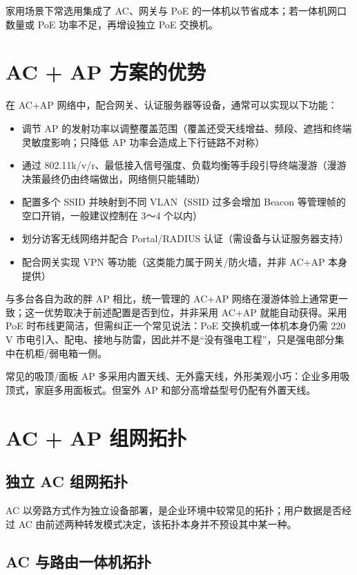 \documentclass[UTF8]{ctexbook}
\begin{document}
家用场景下常选用集成了 AC、网关与 PoE 的一体机以节省成本；若一体机网口数量或 PoE 功率不足，再增设独立 PoE 交换机。

\section{AC + AP 方案的优势}

在 AC+AP 网络中，配合网关、认证服务器等设备，通常可以实现以下功能：

\begin{itemize}
  \item 调节 AP 的发射功率以调整覆盖范围（覆盖还受天线增益、频段、遮挡和终端灵敏度影响；只降低 AP 功率会造成上下行链路不对称）
  \item 通过 802.11k/v/r、最低接入信号强度、负载均衡等手段引导终端漫游（漫游决策最终仍由终端做出，网络侧只能辅助）
  \item 配置多个 SSID 并映射到不同 VLAN（SSID 过多会增加 Beacon 等管理帧的空口开销，一般建议控制在 3～4 个以内）
  \item 划分访客无线网络并配合 Portal/RADIUS 认证（需设备与认证服务器支持）
  \item 配合网关实现 VPN 等功能（这类能力属于网关/防火墙，并非 AC+AP 本身提供）
\end{itemize}

与多台各自为政的胖 AP 相比，统一管理的 AC+AP 网络在漫游体验上通常更一致；这一优势取决于前述配置是否到位，并非采用 AC+AP 就能自动获得。采用 PoE 时布线更简洁，但需纠正一个常见说法：PoE 交换机或一体机本身仍需 220 V 市电引入、配电、接地与防雷，因此并不是\textquotedblleft 没有强电工程\textquotedblright，只是强电部分集中在机柜/弱电箱一侧。

常见的吸顶/面板 AP 多采用内置天线、无外露天线，外形美观小巧：企业多用吸顶式，家庭多用面板式。但室外 AP 和部分高增益型号仍配有外置天线。

\section{AC + AP 组网拓扑}

\subsection{独立 AC 组网拓扑}

AC 以旁路方式作为独立设备部署，是企业环境中较常见的拓扑；用户数据是否经过 AC 由前述两种转发模式决定，该拓扑本身并不预设其中某一种。

\subsection{AC 与路由一体机拓扑}
\end{document}
